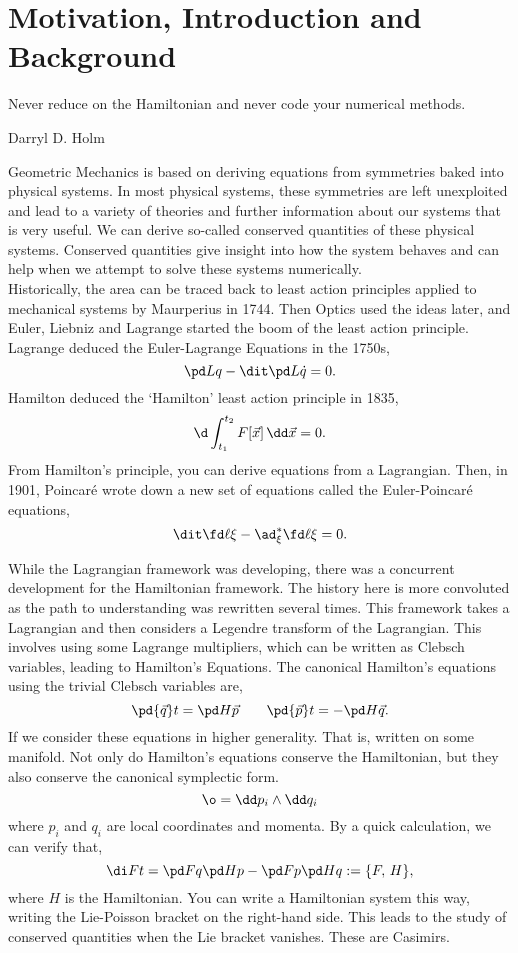 
\chapter{Motivation, Introduction and Background}
\epigraph{Never reduce on the Hamiltonian and never code your numerical methods.}{Darryl D. Holm}
\noindent
Geometric Mechanics is based on deriving equations from symmetries baked into physical systems. In most physical systems, these symmetries are left unexploited and lead to a variety of theories and further information about our systems that is very useful. We can derive so-called conserved quantities of these physical systems. Conserved quantities give insight into how the system behaves and can help when we attempt to solve these systems numerically. \\

\noindent
Historically, the area can be traced back to least action principles applied to mechanical systems by Maurperius in 1744. Then Optics used the ideas later, and Euler, Liebniz and Lagrange started the boom of the least action principle. Lagrange deduced the Euler-Lagrange Equations in the 1750s,
$$ \pd L q - \dit \pd L {\dot q} = 0. $$
Hamilton deduced the `Hamilton' least action principle in 1835,
$$ \d \int_{t_1}^{t_2} F[\vec x] \, \dd \vec x = 0. $$
From Hamilton's principle, you can derive equations from a Lagrangian. Then, in 1901, Poincar\'e wrote down a new set of equations called the Euler-Poincar\'e equations,
$$ \dit \fd \ell \xi - \ad^*_\xi \fd \ell \xi = 0. $$

\noindent
While the Lagrangian framework was developing, there was a concurrent development for the Hamiltonian framework. The history here is more convoluted as the path to understanding was rewritten several times. This framework takes a Lagrangian and then considers a Legendre transform of the Lagrangian. This involves using some Lagrange multipliers, which can be written as Clebsch variables, leading to Hamilton's Equations. The canonical Hamilton's equations using the trivial Clebsch variables are,
$$ \pd {\vec q} t = \pd H {\vec p} \qquad \pd {\vec p} t = -\pd H {\vec q}. $$
If we consider these equations in higher generality. That is, written on some manifold. Not only do Hamilton's equations conserve the Hamiltonian, but they also conserve the canonical symplectic form.
$$ \o = \dd p_i \wedge \dd q_i $$
where $p_i$ and $q_i$ are local coordinates and momenta. By a quick calculation, we can verify that,
$$ \di F t = \pd F q \pd H p - \pd F p \pd H q := \{F,\, H\}, $$
where $H$ is the Hamiltonian. You can write a Hamiltonian system this way, writing the Lie-Poisson bracket on the right-hand side. This leads to the study of conserved quantities when the Lie bracket vanishes. These are Casimirs.\\

